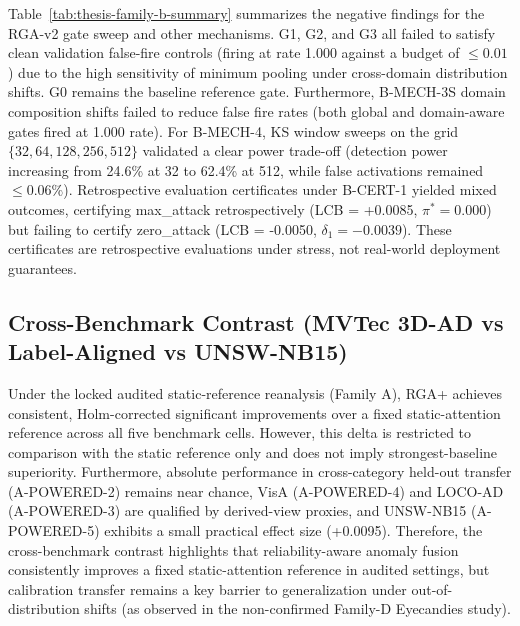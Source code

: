 \documentclass[11pt]{article}
\begin{document}
Table~\ref{tab:thesis-family-b-summary} summarizes the negative findings for the RGA-v2 gate sweep and other mechanisms. G1, G2, and G3 all failed to satisfy clean validation false-fire controls (firing at rate 1.000 against a budget of $\le 0.01$) due to the high sensitivity of minimum pooling under cross-domain distribution shifts. G0 remains the baseline reference gate. Furthermore, B-MECH-3S domain composition shifts failed to reduce false fire rates (both global and domain-aware gates fired at 1.000 rate). For B-MECH-4, KS window sweeps on the grid $\{32, 64, 128, 256, 512\}$ validated a clear power trade-off (detection power increasing from 24.6\% at 32 to 62.4\% at 512, while false activations remained $\le 0.06\%$). Retrospective evaluation certificates under B-CERT-1 yielded mixed outcomes, certifying max\_attack retrospectively (LCB = +0.0085, $\pi^*=0.000$) but failing to certify zero\_attack (LCB = -0.0050, $\delta_1 = -0.0039$). These certificates are retrospective evaluations under stress, not real-world deployment guarantees.

\begin{table}[H]
\centering
\caption{Family-B mechanism replication results, comparing Phase-1 targets with Phase-2 replicated values. The primary comparator is fixed as static\_attention.}
\label{tab:thesis-family-b-mechanism}
\scriptsize

\end{table}

\begin{table}[H]
\centering
\caption{Summary of RGA-v2 gate sweeps, domain-composition shift (B-MECH-3S), KS window-size power sweeps (B-MECH-4), and retrospective certificates (B-CERT-1).}
\label{tab:thesis-family-b-summary}
\scriptsize

\end{table}

\subsection{Cross-Benchmark Contrast (MVTec 3D-AD vs Label-Aligned vs UNSW-NB15)}
\label{sec:thesis-contrast}

Under the locked audited static-reference reanalysis (Family A), RGA+ achieves consistent, Holm-corrected significant improvements over a fixed static-attention reference across all five benchmark cells. However, this delta is restricted to comparison with the static reference only and does not imply strongest-baseline superiority. Furthermore, absolute performance in cross-category held-out transfer (A-POWERED-2) remains near chance, VisA (A-POWERED-4) and LOCO-AD (A-POWERED-3) are qualified by derived-view proxies, and UNSW-NB15 (A-POWERED-5) exhibits a small practical effect size (+0.0095). Therefore, the cross-benchmark contrast highlights that reliability-aware anomaly fusion consistently improves a fixed static-attention reference in audited settings, but calibration transfer remains a key barrier to generalization under out-of-distribution shifts (as observed in the non-confirmed Family-D Eyecandies study).
\end{document}
